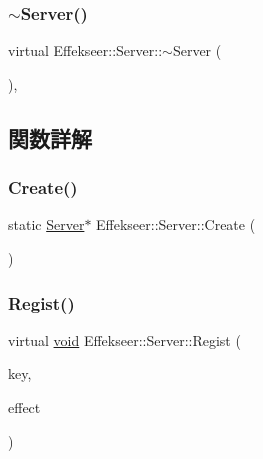 \subsubsection{\texorpdfstring{$\sim$\+Server()}{~Server()}}
{\footnotesize\ttfamily virtual Effekseer\+::\+Server\+::$\sim$\+Server (\begin{DoxyParamCaption}{ }\end{DoxyParamCaption})\hspace{0.3cm}{\ttfamily [inline]}, {\ttfamily [virtual]}}



\subsection{関数詳解}
\mbox{\label{class_effekseer_1_1_server_a010be3e29a3551b3f2bf058b593c3eb0}} 
\subsubsection{\texorpdfstring{Create()}{Create()}}
{\footnotesize\ttfamily static \mbox{\hyperlink{class_effekseer_1_1_server}{Server}}$\ast$ Effekseer\+::\+Server\+::\+Create (\begin{DoxyParamCaption}{ }\end{DoxyParamCaption})\hspace{0.3cm}{\ttfamily [static]}}

\mbox{\label{class_effekseer_1_1_server_aadfbaeb38b0d1fb33ad6646430de45b0}} 
\subsubsection{\texorpdfstring{Regist()}{Regist()}}
{\footnotesize\ttfamily virtual \mbox{\hyperlink{namespace_effekseer_ab34c4088e512200cf4c2716f168deb56}{void}} Effekseer\+::\+Server\+::\+Regist (\begin{DoxyParamCaption}\item[{const \mbox{\hyperlink{_effekseer_8h_aca7eb5de6dd019c19ac58ea35a193f2f}{E\+F\+K\+\_\+\+C\+H\+AR}} $\ast$}]{key,  }\item[{\mbox{\hyperlink{class_effekseer_1_1_effect}{Effect}} $\ast$}]{effect }\end{DoxyParamCaption})\hspace{0.3cm}{\ttfamily [pure virtual]}}



